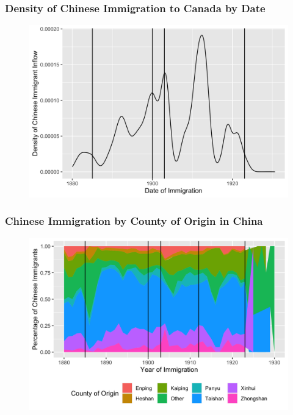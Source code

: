 \documentclass[pdf]{beamer}
\begin{document}
\begin{frame}[label = dateimmchi]
	\frametitle{Density of Chinese Immigration to Canada by Date}
    \centering
	\begin{figure}[H]
		\begin{center}
			\includegraphics[width=\textwidth]{../../figs/dateimmchi.png}
		\end{center}
	\end{figure}
    \hyperlink{yrimmchi}{}
\end{frame}

\begin{frame}[label = originchi]
	\frametitle{Chinese Immigration by County of Origin in China}
    \centering
	\begin{figure}[H]
		\begin{center}
			\includegraphics[width=\textwidth]{../../figs/chiorig.png}
		\end{center}
	\end{figure}
    \hyperlink{events1912}{}
\end{frame}
\end{document}
